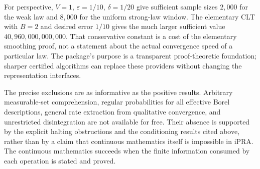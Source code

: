For perspective, $V=1$, $\varepsilon=1/10$, $\delta=1/20$ give sufficient
sample sizes $2{,}000$ for the weak law and $8{,}000$ for the uniform
strong-law window. The elementary CLT with $B=2$ and desired error $1/10$
gives the much larger sufficient value $40{,}960{,}000{,}000{,}000$.
That conservative constant is a cost of the elementary smoothing proof,
not a statement about the actual convergence speed of a particular law.
The package's purpose is a transparent proof-theoretic foundation; sharper
certified algorithms can replace these providers without changing the
representation interfaces.

The precise exclusions are as informative as the positive results.
Arbitrary measurable-set comprehension, regular probabilities for all
effective Borel descriptions, general rate extraction from qualitative
convergence, and unrestricted disintegration are not available for free.
Their absence is supported by the explicit halting obstructions and the
conditioning results cited above, rather than by a claim that continuous
mathematics itself is impossible in iPRA. The continuous mathematics succeeds
when the finite information consumed by each operation is stated and proved.
